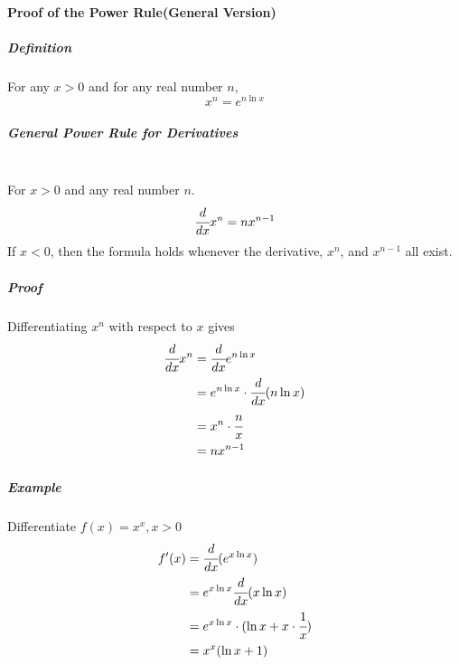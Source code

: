 \documentclass{article}
\begin{document}
            \paragraph{Proof of the Power Rule(General Version)}
                \subparagraph{Definition} For any $x>0$ and for any real number $n$,
                \[x^n=e^{n\ln x}\]
                \subparagraph{General Power Rule for Derivatives}
                \text{}\\
                For $x>0$ and any real number $n$.
                \[\cfrac{d}{dx}x^n=nx^{n-1}\]
                If $x<0$, then the formula holds whenever the derivative, $x^n$, and $x^{n-1}$ all exist.
                \subparagraph{Proof} Differentiating $x^n$ with respect to $x$ gives\\
                \begin{equation}
                    \begin{aligned}
                        \cfrac{d}{dx}x^n&=\cfrac{d}{dx}e^{n\ln x}\\
                        &=e^{n\ln x}\cdot\cfrac{d}{dx}(n\ln x)\\
                        &=x^n\cdot \cfrac{n}{x}\\
                        &=nx^{n-1}
                    \end{aligned}
                \end{equation}
                \subparagraph{Example} Differentiate $f(x)=x^x,x>0$
                \begin{equation}
                    \begin{aligned}
                        f'(x)&=\cfrac{d}{dx}(e^{x\ln x})\\
                        &=e^{x\ln x}\cfrac{d}{dx}(x\ln x)\\
                        &=e^{x\ln x}\cdot(\ln x+x\cdot\cfrac{1}{x})\\
                        &=x^x(\ln x+1)
                    \end{aligned}
                \end{equation}
\end{document}
